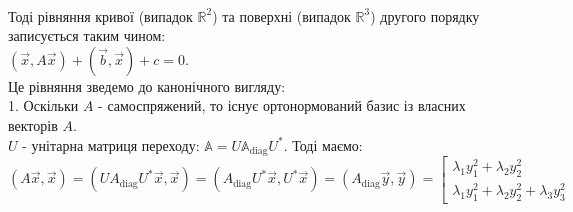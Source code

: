 \documentclass[a4paper, 10pt]{article}
\theoremstyle{theoremdd}
\begin{document}
\bigskip \\
Тоді рівняння кривої (випадок $\mathbb{R}^2$) та поверхні (випадок $\mathbb{R}^3$) другого порядку записується таким чином:\\
$(\vec{x}, A \vec{x}) + (\vec{b}, \vec{x}) + c = 0$.\\
Це рівняння зведемо до канонічного вигляду:\\
1. Оскільки $A$ - самоспряжений, то існує ортонормований базис із власних векторів $A$.\\
$U$ - унітарна матриця переходу: $\mathbb{A} = U \mathbb{A}_{\textrm{diag}} U^*$. Тоді маємо:\\
$(A\vec{x}, \vec{x}) = (U A_{\textrm{diag}} U^* \vec{x}, \vec{x}) = (A_{\textrm{diag}} U^* \vec{x}, U^* \vec{x}) = (A_{\textrm{diag}}\vec{y}, \vec{y}) = \left[ \begin{gathered} \lambda_1 y_1^2 + \lambda_2 y_2^2 \\
\lambda_1 y_1^2 + \lambda_2 y_2^2 + \lambda_3 y_3^2
 \end{gathered} \right.$
\end{document}
